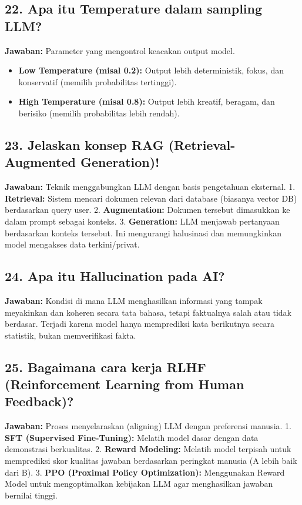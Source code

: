 \subsection{22. Apa itu Temperature dalam sampling LLM?}
\textbf{Jawaban:}
Parameter yang mengontrol keacakan output model.
\begin{itemize}
    \item \textbf{Low Temperature (misal 0.2):} Output lebih deterministik, fokus, dan konservatif (memilih probabilitas tertinggi).
    \item \textbf{High Temperature (misal 0.8):} Output lebih kreatif, beragam, dan berisiko (memilih probabilitas lebih rendah).
\end{itemize}

\subsection{23. Jelaskan konsep RAG (Retrieval-Augmented Generation)!}
\textbf{Jawaban:}
Teknik menggabungkan LLM dengan basis pengetahuan eksternal.
1. \textbf{Retrieval:} Sistem mencari dokumen relevan dari database (biasanya vector DB) berdasarkan query user.
2. \textbf{Augmentation:} Dokumen tersebut dimasukkan ke dalam prompt sebagai konteks.
3. \textbf{Generation:} LLM menjawab pertanyaan berdasarkan konteks tersebut.
Ini mengurangi halusinasi dan memungkinkan model mengakses data terkini/privat.

\subsection{24. Apa itu Hallucination pada AI?}
\textbf{Jawaban:}
Kondisi di mana LLM menghasilkan informasi yang tampak meyakinkan dan koheren secara tata bahasa, tetapi faktualnya salah atau tidak berdasar. Terjadi karena model hanya memprediksi kata berikutnya secara statistik, bukan memverifikasi fakta.

\subsection{25. Bagaimana cara kerja RLHF (Reinforcement Learning from Human Feedback)?}
\textbf{Jawaban:}
Proses menyelaraskan (aligning) LLM dengan preferensi manusia.
1. \textbf{SFT (Supervised Fine-Tuning):} Melatih model dasar dengan data demonstrasi berkualitas.
2. \textbf{Reward Modeling:} Melatih model terpisah untuk memprediksi skor kualitas jawaban berdasarkan peringkat manusia (A lebih baik dari B).
3. \textbf{PPO (Proximal Policy Optimization):} Menggunakan Reward Model untuk mengoptimalkan kebijakan LLM agar menghasilkan jawaban bernilai tinggi.

